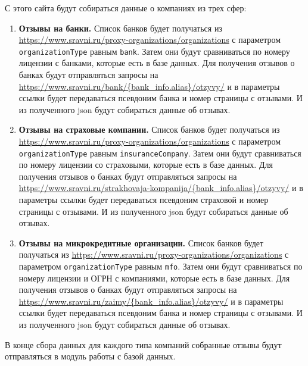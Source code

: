 \documentclass{article}
\begin{document}
С этого сайта будут собираться данные о компаниях из трех сфер:
\begin{enumerate}
\item \textbf{Отзывы на банки.}
Список банков будет получаться из \url{https://www.sravni.ru/proxy-organizations/organizations} с параметром \texttt{organizationType} равным \texttt{bank}. Затем они будут сравниваться по номеру лицензии с банками, которые есть в базе данных. Для получения отзывов о банках будут отправляться запросы на \url{https://www.sravni.ru/bank/\{bank\_info.alias\}/otzyvy/} и в параметры ссылки будет передаваться псевдоним банка и номер страницы с отзывами. И из полученного json будут собираться данные об отзывах.
\item \textbf{Отзывы на страховые компании.}
Список банков будет получаться из \url{https://www.sravni.ru/proxy-organizations/organizations} с параметром \texttt{organizationType} равным \texttt{insuranceCompany}. Затем они будут сравниваться по номеру лицензии со страховыми, которые есть в базе данных. Для получения отзывов о банках будут отправляться запросы на \url{https://www.sravni.ru/strakhovaja-kompanija/\{bank\_info.alias\}/otzyvy/} и в параметры ссылки будет передаваться псевдоним страховой и номер страницы с отзывами. И из полученного json будут собираться данные об отзывах.
\item \textbf{Отзывы на микрокредитные организации.}
Список банков будет получаться из \url{https://www.sravni.ru/proxy-organizations/organizations} с параметром \texttt{organizationType} равным \texttt{mfo}. Затем они будут сравниваться по номеру лицензии и ОГРН с компаниями, которые есть в базе данных. Для получения отзывов о банках будут отправляться запросы на \url{https://www.sravni.ru/zaimy/\{bank\_info.alias\}/otzyvy/} и в параметры ссылки будет передаваться псевдоним банка и номер страницы с отзывами. И из полученного json будут собираться данные об отзывах.
\end{enumerate}
В конце сбора данных для каждого типа компаний собранные отзывы будут отправляться в модуль работы с базой данных.
\end{document}
